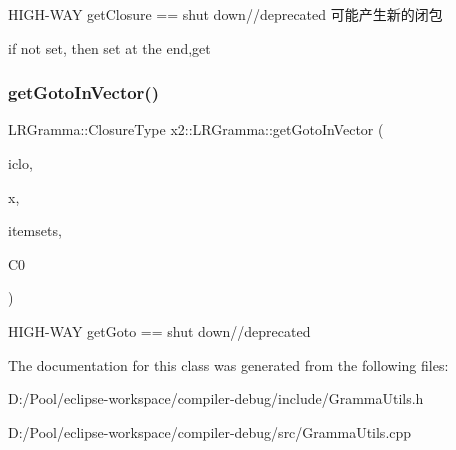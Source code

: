 H\+I\+G\+H-\/\+W\+AY get\+Closure == shut down//deprecated 可能产生新的闭包

if not set, then set at the end,get \mbox{\label{classx2_1_1_l_r_gramma_a933cdf18c4a8515dbeef0cea0bdaf04e}} 
\subsubsection{\texorpdfstring{get\+Goto\+In\+Vector()}{getGotoInVector()}}
{\footnotesize\ttfamily L\+R\+Gramma\+::\+Closure\+Type x2\+::\+L\+R\+Gramma\+::get\+Goto\+In\+Vector (\begin{DoxyParamCaption}\item[{int}]{iclo,  }\item[{int}]{x,  }\item[{Closures\+Vector \&}]{itemsets,  }\item[{std\+::map$<$ Item\+Type, int $>$ \&}]{C0 }\end{DoxyParamCaption})}

H\+I\+G\+H-\/\+W\+AY get\+Goto == shut down//deprecated 

The documentation for this class was generated from the following files\+:\begin{DoxyCompactItemize}
\item 
D\+:/\+Pool/eclipse-\/workspace/compiler-\/debug/include/Gramma\+Utils.\+h\item 
D\+:/\+Pool/eclipse-\/workspace/compiler-\/debug/src/Gramma\+Utils.\+cpp\end{DoxyCompactItemize}

